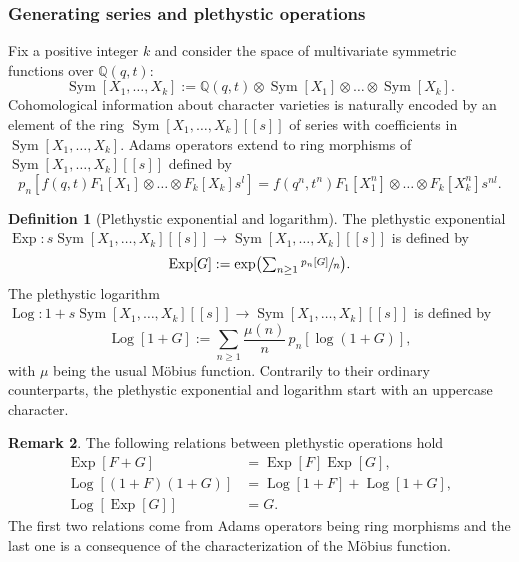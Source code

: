 \documentclass[JEP,XML,SOM,NoEqCountersInSection,Unicode,published]{cedram}
\theoremstyle{definition}
\newtheorem{definition}{Definition}[section]
\newtheorem{remark}[definition]{Remark}
\theoremstyle{plain}
\DeclareMathOperator{\SymF}{Sym}
\DeclareMathOperator{\Exp}{Exp}
\DeclareMathOperator{\Log}{Log}
\begin{document}
\subsubsection{Generating series and plethystic operations}
Fix a positive integer $k$ and consider the space of multivariate symmetric functions over $\mathbb{Q}(q,t)$:
\[
\SymF[X_1,\dots,X_k]:=\mathbb{Q}(q,t)\otimes \SymF[X_1]\otimes\dots\otimes \SymF[X_k].
\]
Cohomological information about character varieties is naturally encoded by an ele\-ment of the ring $\SymF[X_1,\dots,X_k][\![s]\!]$ of series with coefficients in $\SymF[X_1,\dots,X_k]$. Adams operators extend to ring morphisms of $\SymF[X_1,\dots,X_k][\![s]\!]$ defined by
\[
p_n\left[f(q,t)F_1\left[X_1\right]\otimes\dots\otimes F_k\left[X_k\right]s^l\right]=f(q^n,t^n)F_1\left[X_1^n\right]\otimes\dots\otimes F_k\left[X_k^n\right]s^{n l}.
\]
\begin{definition}[Plethystic exponential and logarithm]
The plethystic exponential $\Exp : s \SymF [X_1,\dots,X_k][\![s]\!] \to \SymF [X_1,\dots,X_k][\![s]\!]$ is defined by
\[\textstyle
\Exp [G] := \exp\bigl(\sum_{n\ge 1} \sfrac{p_n[G]}{n} \bigr).
\]
The plethystic logarithm $\Log : 1+ s \SymF [X_1,\dots,X_k][\![s]\!] \to \SymF [X_1,\dots,X_k][\![s]\!]$ is defined by
\[
\Log[1+G]:=\sum_{n\ge 1}\frac{\mu(n)}{n}\,p_n \left[\log(1+G)\right],
\]
with $\mu$ being the usual Möbius function. Contrarily to their ordinary counterparts, the plethystic exponential and logarithm start with an uppercase character.
\end{definition}

\begin{remark}
The following relations between plethystic operations hold
\begin{align*}
\Exp[F+G]&=\Exp[F]\Exp[G],\\
\Log[(1+F)(1+G)]&=\Log[1+F]+\Log[1+G], \\
\Log[\Exp[G]] &=G.
\end{align*}
The first two relations come from Adams operators being ring morphisms and the last one is a consequence of the characterization of the Möbius function.
\end{remark}
\end{document}
